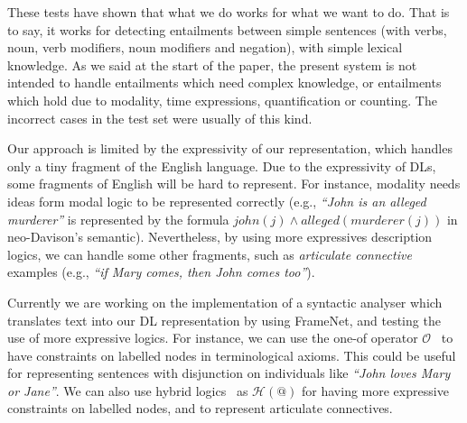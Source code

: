 \documentclass{esslli}
\begin{document}
These tests have shown that what we do works for what we want to do.
That is to say, it works for detecting entailments between simple
sentences (with verbs, noun, verb modifiers, noun modifiers and
negation), with simple lexical knowledge. As we said at the start of
the paper, the present system is not intended to handle entailments
which need complex knowledge, or entailments which hold due to modality,
time expressions, quantification or counting. The incorrect cases in the
test set were usually of this kind.

Our approach is limited by the expressivity of our representation,
which handles only a tiny fragment of the English language. Due to the
expressivity of DLs, some fragments of English will be hard to
represent. For instance, modality needs ideas form modal logic to be
represented correctly (e.g., \emph{``John is an alleged murderer''} is
represented by the formula $john(j) \wedge alleged(murderer(j))$ in
neo-Davison's semantic). Nevertheless, by using more expressives
description logics, we can handle some other fragments, such as
\textit{articulate connective} examples (e.g., \emph{``if Mary comes,
then John comes too''}).

Currently we are working on the implementation of a syntactic analyser
which translates text into our DL representation by using FrameNet,
and testing the use of more expressive logics. For instance, we can
use the one-of operator
$\mathcal{O}$~\cite{DBLP:conf/dlog/2003handbook} to have constraints
on labelled nodes in terminological axioms. This could be useful for
representing sentences with disjunction on individuals like
\emph{``John loves Mary or Jane''}. We can also use hybrid
logics~\cite{areces05:_hybrid_logic} as $\mathcal{H}(@)$ for having
more expressive constraints on labelled nodes, and to represent
articulate connectives.

 

\nocite{*}
\end{document}
